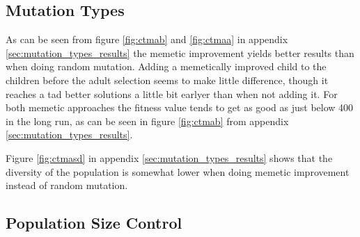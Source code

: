 
\subsection{Mutation Types} %
\label{sub:mutation_types}

As can be seen from figure \ref{fig:ctmab} and \ref{fig:ctmaa} in appendix \ref{sec:mutation_types_results} the memetic improvement yields better results than when doing random mutation. Adding a memetically improved child to the children before the adult selection seems to make little difference, though it reaches a tad better solutions a little bit earlyer than when not adding it. For both memetic approaches the fitness value tends to get as good as just below 400 in the long run, as can be seen in figure \ref{fig:ctmab} from appendix \ref{sec:mutation_types_results}.

Figure \ref{fig:ctmasd} in appendix \ref{sec:mutation_types_results} shows that the diversity of the population is somewhat lower when doing memetic improvement instead of random mutation.





\subsection{Population Size Control} %
\label{sub:population_size_control}

